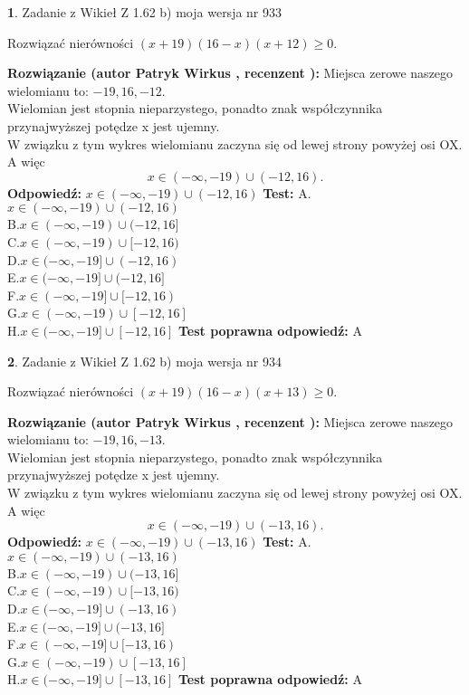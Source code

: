 \documentclass[12pt, a4paper]{article}
\theoremstyle{definition} %
\newtheorem{zad}{}
\newcommand{\zadStart}[1]{\begin{zad}#1\newline}
\newcommand{\zadStop}{\end{zad}}
\newcommand{\rozwStart}[2]{\noindent \textbf{Rozwiązanie (autor #1 , recenzent #2): }\newline}
\newcommand{\rozwStop}{\newline}
\newcommand{\odpStart}{\noindent \textbf{Odpowiedź:}\newline}
\newcommand{\odpStop}{\newline}
\newcommand{\testStart}{\noindent \textbf{Test:}\newline}
\newcommand{\testStop}{\newline}
\newcommand{\kluczStart}{\noindent \textbf{Test poprawna odpowiedź:}\newline}
\newcommand{\kluczStop}{\newline}
\begin{document}
\zadStart{Zadanie z Wikieł Z 1.62 b) moja wersja nr 933}

Rozwiązać nierówności $(x+19)(16-x)(x+12)\ge0$.
\zadStop
\rozwStart{Patryk Wirkus}{}
Miejsca zerowe naszego wielomianu to: $-19, 16, -12$.\\
Wielomian jest stopnia nieparzystego, ponadto znak współczynnika przy\linebreak najwyższej potędze x jest ujemny.\\ W związku z tym wykres wielomianu zaczyna się od lewej strony powyżej osi OX. A więc $$x \in (-\infty,-19) \cup (-12,16).$$
\rozwStop
\odpStart
$x \in (-\infty,-19) \cup (-12,16)$
\odpStop
\testStart
A.$x \in (-\infty,-19) \cup (-12,16)$\\
B.$x \in (-\infty,-19) \cup (-12,16]$\\
C.$x \in (-\infty,-19) \cup [-12,16)$\\
D.$x \in (-\infty,-19] \cup (-12,16)$\\
E.$x \in (-\infty,-19] \cup (-12,16]$\\
F.$x \in (-\infty,-19] \cup [-12,16)$\\
G.$x \in (-\infty,-19) \cup [-12,16]$\\
H.$x \in (-\infty,-19] \cup [-12,16]$
\testStop
\kluczStart
A
\kluczStop



\zadStart{Zadanie z Wikieł Z 1.62 b) moja wersja nr 934}

Rozwiązać nierówności $(x+19)(16-x)(x+13)\ge0$.
\zadStop
\rozwStart{Patryk Wirkus}{}
Miejsca zerowe naszego wielomianu to: $-19, 16, -13$.\\
Wielomian jest stopnia nieparzystego, ponadto znak współczynnika przy\linebreak najwyższej potędze x jest ujemny.\\ W związku z tym wykres wielomianu zaczyna się od lewej strony powyżej osi OX. A więc $$x \in (-\infty,-19) \cup (-13,16).$$
\rozwStop
\odpStart
$x \in (-\infty,-19) \cup (-13,16)$
\odpStop
\testStart
A.$x \in (-\infty,-19) \cup (-13,16)$\\
B.$x \in (-\infty,-19) \cup (-13,16]$\\
C.$x \in (-\infty,-19) \cup [-13,16)$\\
D.$x \in (-\infty,-19] \cup (-13,16)$\\
E.$x \in (-\infty,-19] \cup (-13,16]$\\
F.$x \in (-\infty,-19] \cup [-13,16)$\\
G.$x \in (-\infty,-19) \cup [-13,16]$\\
H.$x \in (-\infty,-19] \cup [-13,16]$
\testStop
\kluczStart
A
\kluczStop
\end{document}
